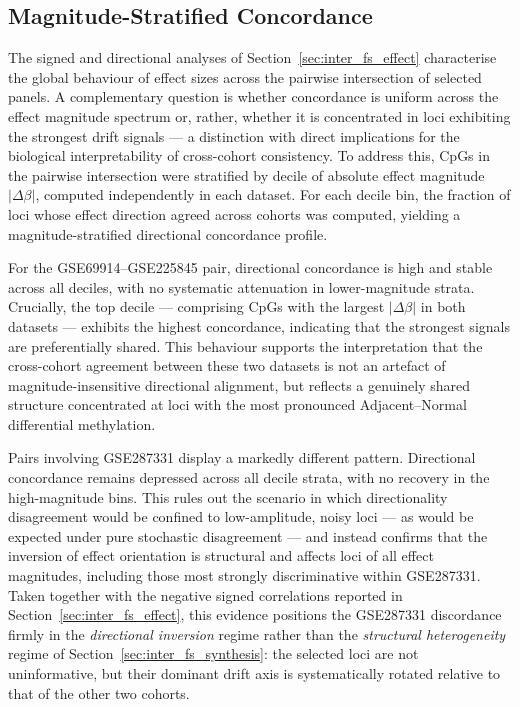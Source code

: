 \subsection{Magnitude-Stratified Concordance}
\label{sec:inter_fs_magnitude}

The signed and directional analyses of Section~\ref{sec:inter_fs_effect}
characterise the global behaviour of effect sizes across the pairwise
intersection of selected panels.
A complementary question is whether concordance is uniform across the
effect magnitude spectrum or, rather, whether it is concentrated in loci
exhibiting the strongest drift signals — a distinction with direct
implications for the biological interpretability of cross-cohort
consistency.
To address this, CpGs in the pairwise intersection were stratified by
decile of absolute effect magnitude $|\Delta\beta|$, computed
independently in each dataset.
For each decile bin, the fraction of loci whose effect direction agreed
across cohorts was computed, yielding a magnitude-stratified directional
concordance profile.

For the GSE69914--GSE225845 pair, directional concordance is high and
stable across all deciles, with no systematic attenuation in lower-magnitude
strata.
Crucially, the top decile — comprising CpGs with the largest
$|\Delta\beta|$ in both datasets — exhibits the highest concordance,
indicating that the strongest signals are preferentially shared.
This behaviour supports the interpretation that the cross-cohort
agreement between these two datasets is not an artefact of
magnitude-insensitive directional alignment, but reflects a genuinely
shared structure concentrated at loci with the most pronounced
Adjacent--Normal differential methylation.

Pairs involving GSE287331 display a markedly different pattern.
Directional concordance remains depressed across all decile strata,
with no recovery in the high-magnitude bins.
This rules out the scenario in which directionality disagreement
would be confined to low-amplitude, noisy loci — as would be
expected under pure stochastic disagreement — and instead confirms
that the inversion of effect orientation is structural and affects
loci of all effect magnitudes, including those most strongly
discriminative within GSE287331.
Taken together with the negative signed correlations reported in
Section~\ref{sec:inter_fs_effect}, this evidence positions the
GSE287331 discordance firmly in the \emph{directional inversion}
regime rather than the \emph{structural heterogeneity} regime
of Section~\ref{sec:inter_fs_synthesis}: the selected loci
are not uninformative, but their dominant drift axis is systematically
rotated relative to that of the other two cohorts.


